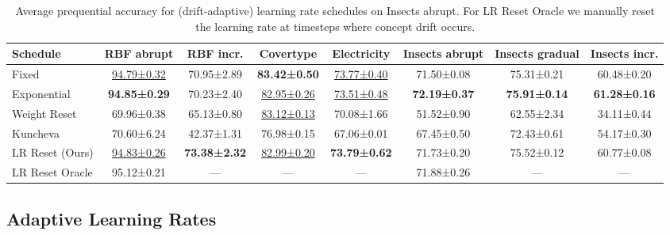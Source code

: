 \documentclass[letterpaper]{article} %
\begin{document}
\begin{table}[ht]
	\centering
	\small
	\begin{tabular}{lccccccc}
		\toprule
		Schedule        & RBF abrupt             & RBF incr.            & Covertype              & Electricity            & Insects abrupt       & Insects gradual      & Insects incr.        \\
		\midrule
		Fixed           & \underline{94.79±0.32} & 70.95±2.89           & \bfseries 83.42±0.50   & \underline{73.77±0.40} & 71.50±0.08           & 75.31±0.21           & 60.48±0.20           \\
		Exponential     & \bfseries 94.85±0.29   & 70.23±2.40           & \underline{82.95±0.26} & \underline{73.51±0.48} & \bfseries 72.19±0.37 & \bfseries 75.91±0.14 & \bfseries 61.28±0.16 \\ \midrule
		Weight Reset    & 69.96±0.38             & 65.13±0.80           & \underline{83.12±0.13} & 70.08±1.66             & 51.52±0.90           & 62.55±2.34           & 34.11±0.44           \\
		Kuncheva        & 70.60±6.24             & 42.37±1.31           & 76.98±0.15             & 67.06±0.01             & 67.45±0.50           & 72.43±0.61           & 54.17±0.30           \\
		LR Reset (Ours) & \underline{94.83±0.26} & \bfseries 73.38±2.32 & \underline{82.99±0.20} & \bfseries 73.79±0.62   & 71.73±0.20           & 75.52±0.12           & 60.77±0.08           \\
		LR Reset Oracle & 95.12±0.21             & ---                  & ---                    & ---                    & 71.88±0.26           & ---                  & ---                  \\
		\bottomrule
	\end{tabular}
	\caption{Average prequential accuracy for (drift-adaptive) learning rate schedules on Insects abrupt. For LR Reset Oracle we manually reset the learning rate at timesteps where concept drift occurs.}
	\label{tab:lr_resetting}
\end{table}

\subsection{Adaptive Learning Rates}
\end{document}
